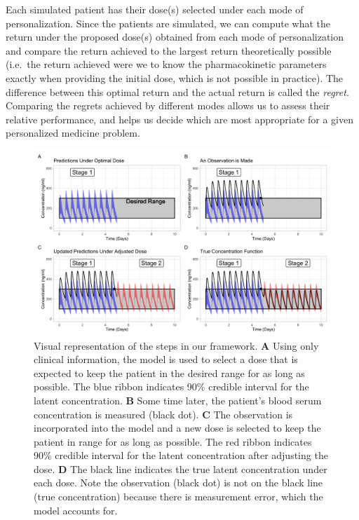Each simulated patient has their dose(s) selected under each mode of personalization.  Since the patients are simulated, we can compute what the return under the proposed dose(s) obtained from each mode of personalization and compare the return achieved to the largest return theoretically possible (i.e.\ the return achieved were we to know the pharmacokinetic parameters exactly when providing the initial dose, which is not possible in practice). The difference between this optimal return and the actual return is called the \textit{regret}. Comparing the regrets achieved by different modes allows us to assess their relative performance, and helps us decide which are most appropriate for a given personalized medicine problem.

\begin{figure}
	\centering
	\includegraphics[width=1\linewidth]{figures/viz_of_process.png}
	\caption{
	Visual representation of the steps in our framework.	\textbf{A}  Using only clinical information, the model is used to select a dose that is expected to keep the patient in the desired range for as long as possible. The blue ribbon indicates 90\% credible interval for the latent concentration.  \textbf{B} Some time later, the patient's blood serum concentration is measured (black dot). \textbf{C}  The observation is incorporated into the model and a new dose is selected to keep the patient in range for as long as possible. The red ribbon indicates 90\% credible interval for the latent concentration after adjusting the dose. \textbf{D} The black line indicates the true latent concentration under each dose.  Note the observation (black dot) is not on the black line (true concentration) because there is measurement error, which the model accounts for.
}
	\label{fig:processfiguresingle}
\end{figure}

